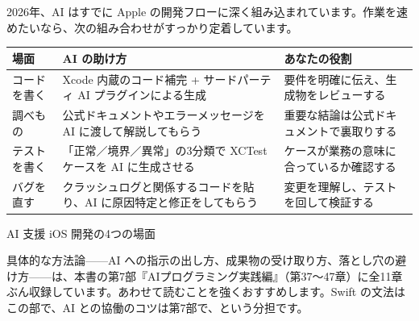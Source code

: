 
2026年、AI はすでに Apple の開発フローに深く組み込まれています。作業を速めたいなら、次の組み合わせがすっかり定着しています。

\begin{center}
\begin{tabularx}{\linewidth}{|X|X|X|}
\hline
\textbf{場面} & \textbf{AI の助け方} & \textbf{あなたの役割} \tabularnewline
\hline
コードを書く & Xcode 内蔵のコード補完 + サードパーティ AI プラグインによる生成 & 要件を明確に伝え、生成物をレビューする \tabularnewline
調べもの & 公式ドキュメントやエラーメッセージを AI に渡して解説してもらう & 重要な結論は公式ドキュメントで裏取りする \tabularnewline
テストを書く & 「正常／境界／異常」の3分類で XCTest ケースを AI に生成させる & ケースが業務の意味に合っているか確認する \tabularnewline
バグを直す & クラッシュログと関係するコードを貼り、AI に原因特定と修正をしてもらう & 変更を理解し、テストを回して検証する \tabularnewline
\hline
\end{tabularx}
\end{center}

\begin{center}\small\color{gray}AI 支援 iOS 開発の4つの場面\end{center}

具体的な方法論——AI への指示の出し方、成果物の受け取り方、落とし穴の避け方——は、本書の第7部『AIプログラミング実践編』（第37〜47章）に全11章ぶん収録しています。あわせて読むことを強くおすすめします。Swift の文法はこの部で、AI との協働のコツは第7部で、という分担です。

